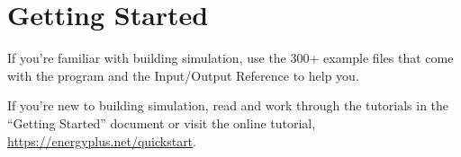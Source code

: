 \section{Getting Started}\label{getting-started}

If you're familiar with building simulation, use the 300+ example files that come with the program and the Input/Output Reference to help you.

If you're new to building simulation, read and work through the tutorials in the ``Getting Started'' document or visit the online tutorial, \url{https://energyplus.net/quickstart}.
